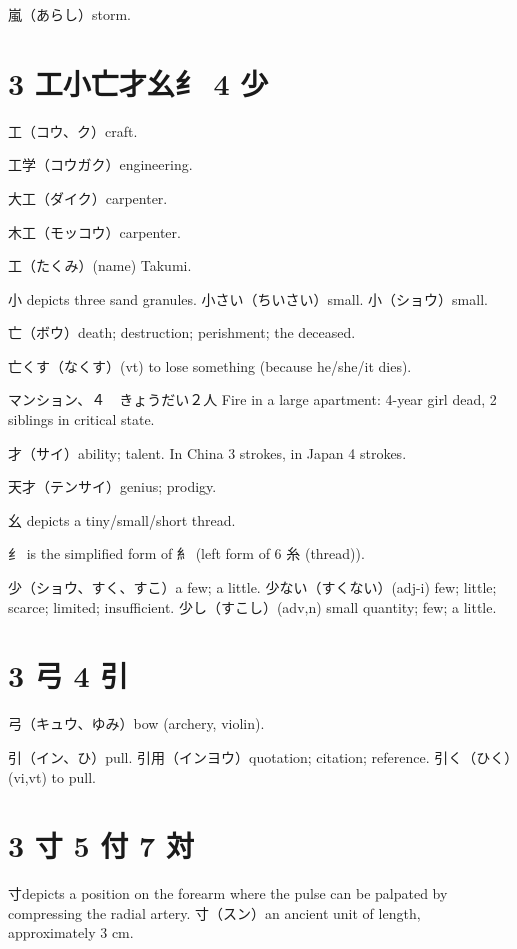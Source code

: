 嵐（あらし）storm.

\section{3 工小亡才幺纟 4 少}

工（コウ、ク）craft.

工学（コウガク）engineering.

大工（ダイク）carpenter.

木工（モッコウ）carpenter.

工（たくみ）(name) Takumi.

小 depicts three sand granules.
小さい（ちいさい）small.
小（ショウ）small.

亡（ボウ）death; destruction; perishment; the deceased.

亡くす（なくす）(vt) to lose something (because he/she/it dies).

マンション、４　きょうだい２人
Fire in a large apartment: 4-year girl dead, 2 siblings in critical state.

才（サイ）ability; talent.
In China 3 strokes, in Japan 4 strokes.

天才（テンサイ）genius; prodigy.

幺 depicts a tiny/small/short thread.

纟 is the simplified form of 糹
(left form of 6 糸 (thread)).

少（ショウ、すく、すこ）a few; a little.
少ない（すくない）(adj-i) few; little; scarce; limited; insufficient.
少し（すこし）(adv,n) small quantity; few; a little.

\section{3 弓 4 引}

弓（キュウ、ゆみ）bow (archery, violin).

引（イン、ひ）pull.
引用（インヨウ）quotation; citation; reference.
引く（ひく）(vi,vt) to pull.

\section{3 寸 5 付 7 対}

寸depicts a position on the forearm
where the pulse can be palpated by compressing the radial artery.
寸（スン）an ancient unit of length, approximately 3 cm.


